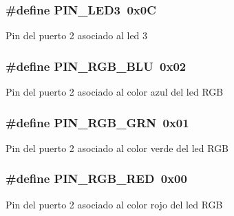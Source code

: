 \subsubsection[{\texorpdfstring{P\+I\+N\+\_\+\+L\+E\+D3}{PIN_LED3}}]{\setlength{\rightskip}{0pt plus 5cm}\#define P\+I\+N\+\_\+\+L\+E\+D3~0x0C}\hypertarget{group__hardware_ga95a9a1b175a118c828537db81141eb3d}{}\label{group__hardware_ga95a9a1b175a118c828537db81141eb3d}
Pin del puerto 2 asociado al led 3 
\subsubsection[{\texorpdfstring{P\+I\+N\+\_\+\+R\+G\+B\+\_\+\+B\+LU}{PIN_RGB_BLU}}]{\setlength{\rightskip}{0pt plus 5cm}\#define P\+I\+N\+\_\+\+R\+G\+B\+\_\+\+B\+LU~0x02}\hypertarget{group__hardware_gadf8d2d730566aede36c12ccfbc03b1b7}{}\label{group__hardware_gadf8d2d730566aede36c12ccfbc03b1b7}
Pin del puerto 2 asociado al color azul del led R\+GB 
\subsubsection[{\texorpdfstring{P\+I\+N\+\_\+\+R\+G\+B\+\_\+\+G\+RN}{PIN_RGB_GRN}}]{\setlength{\rightskip}{0pt plus 5cm}\#define P\+I\+N\+\_\+\+R\+G\+B\+\_\+\+G\+RN~0x01}\hypertarget{group__hardware_ga298bb5d50ab2ba7b00df1c59087de286}{}\label{group__hardware_ga298bb5d50ab2ba7b00df1c59087de286}
Pin del puerto 2 asociado al color verde del led R\+GB 
\subsubsection[{\texorpdfstring{P\+I\+N\+\_\+\+R\+G\+B\+\_\+\+R\+ED}{PIN_RGB_RED}}]{\setlength{\rightskip}{0pt plus 5cm}\#define P\+I\+N\+\_\+\+R\+G\+B\+\_\+\+R\+ED~0x00}\hypertarget{group__hardware_gaf3069b94e5b50d3558f6c36dd2e7ab15}{}\label{group__hardware_gaf3069b94e5b50d3558f6c36dd2e7ab15}
Pin del puerto 2 asociado al color rojo del led R\+GB 
